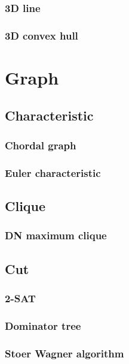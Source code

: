\documentclass[titlepage,a4paper,10pt]{article}
\begin{document}
\begin{multicols}{2}
\begin{spacing}{0.8}
{				\subsubsection{3D line}
					
				\subsubsection{3D convex hull}
					
		\section{Graph}
			
			\subsection{Characteristic}
				\subsubsection{Chordal graph}
					
				\subsubsection{Euler characteristic}
					
			\subsection{Clique}
				\subsubsection{DN maximum clique}
					
			\subsection{Cut}
				\subsubsection{2-SAT}
					
				\subsubsection{Dominator tree}
					
				\subsubsection{Stoer Wagner algorithm}
					
}
\end{spacing}
\end{multicols}
\end{document}
